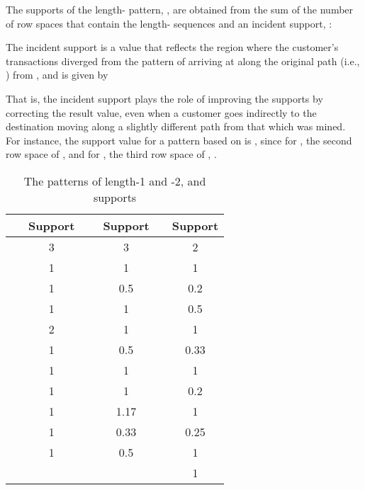 \documentclass[final,authoryear,5p,times,twocolumn]{elsarticle}
\begin{document}
 
The supports of the length- pattern, , are obtained from the sum of the number of row spaces that contain the length- sequences and an incident support, :

The incident support is a value that reflects the region where the customer's transactions diverged from the pattern of arriving at  along the original path (i.e., ) from , and is given by

That is, the incident support plays the role of improving the supports by correcting the result value, even when a customer goes indirectly to the destination moving along a slightly different path from that which was mined. For instance, the support value for a pattern  based on  is , since for , the second row space of ,  and for , the third row space of , .

\begin{table}[h]
\begin{center}
    \begin{tabular}{|cc|cccc|}
    \hline
                                  & Support &                                 & Support &                                    & Support \\ \hline
      & 3       &   & 3       &   & 2       \\
      & 1       &   & 1       &   & 1       \\
      & 1       &   & 0.5     &  & 0.2     \\
      & 1       &   & 1       &  & 0.5     \\
      & 2       &   & 1       &   & 1       \\
      & 1       &   & 0.5     &   & 0.33    \\
      & 1       &   & 1       &  & 1       \\
      & 1       &   & 1       &   & 0.2     \\
     & 1       &   & 1.17    &   & 1       \\
     & 1       &   & 0.33    &  & 0.25    \\
     & 1       &   & 0.5     &  & 1       \\
    ~                                    & ~       & ~                                      & ~     &  & 1       \\ \hline
    \end{tabular}
    \caption {The patterns of length-1 and -2, and supports}
    \label{tab:support}
\end{center}
\end{table}
\end{document}
